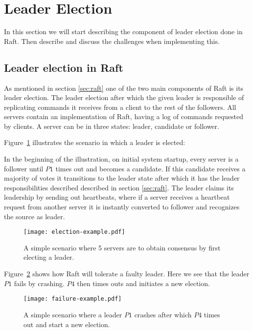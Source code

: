 \section{Leader Election} %
\label{sec:leader_election}
In this section we will start describing the component of leader election done in Raft. Then describe and discuss the challenges when implementing this.

\subsection{Leader election in Raft}
As mentioned in section \ref{sec:raft} one of the two main components of Raft is its leader election. The leader election after which the given leader is responsible of replicating commands it receives from a client to the rest of the followers. All servers contain an implementation of Raft, having a log of commands requested by clients. A server can be in three states: leader, candidate or follower.

Figure~\ref{fig:election_example} illustrates the scenario in which a leader is elected:

In the beginning of the illustration, on initial system startup, every server is a follower until $P1$ times out and becomes a candidate. If this candidate receives a majority of votes it transitions to the leader state after which it has the leader responsibilities described described in section \ref{sec:raft}. The leader claims its leadership by sending out heartbeats, where if a server receives a heartbeat request from another server it is instantly converted to follower and recognizes the source as leader.

\begin{figure}[ht!]
\centering
\texttt{[image: election-example.pdf]}
\caption{A simple scenario where 5 servers are to obtain consensus by first electing a leader.}
\label{fig:election_example}
\end{figure}

Figure~\ref{fig:failure_example} shows how Raft will tolerate a faulty leader. Here we see that the leader $P1$ fails by crashing. $P4$ then times outs and initiates a new election.

\begin{figure}[ht!]
\centering
\texttt{[image: failure-example.pdf]}
\caption{A simple scenario where a leader $P1$ crashes after which $P4$ times out and start a new election.}
\label{fig:failure_example}
\end{figure}

